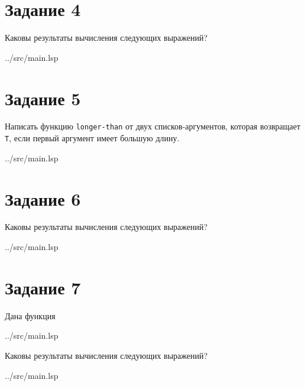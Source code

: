 \section*{Задание 4}

Каковы результаты вычисления следующих выражений?

\begin{lstinputlisting}[
	caption={Задание 4},
	label={lst:t4},
	style={lsp},
	linerange={24-31},
	]{../src/main.lsp}
\end{lstinputlisting}

\section*{Задание 5}

Написать функцию {\texttt{longer-than}} от двух списков-аргументов, которая возвращает {\texttt{T}}, если первый аргумент имеет большую длину.

\begin{lstinputlisting}[
	caption={Задание 5},
	label={lst:t5},
	style={lsp},
	linerange={34-38},
	]{../src/main.lsp}
\end{lstinputlisting}

\section*{Задание 6}

Каковы результаты вычисления следующих выражений?

\begin{lstinputlisting}[
	caption={Задание 6},
	label={lst:t6},
	style={lsp},
	linerange={42-48},
	]{../src/main.lsp}
\end{lstinputlisting}

\section*{Задание 7}

Дана функция 

\begin{lstinputlisting}[
	caption={mystery},
	label={lst:func},
	style={lsp},
	linerange={50-51},
	]{../src/main.lsp}
\end{lstinputlisting}

Каковы результаты вычисления следующих выражений?

\begin{lstinputlisting}[
	caption={Задание 7},
	label={lst:t7},
	style={lsp},
	linerange={53-56},
	]{../src/main.lsp}
\end{lstinputlisting}

